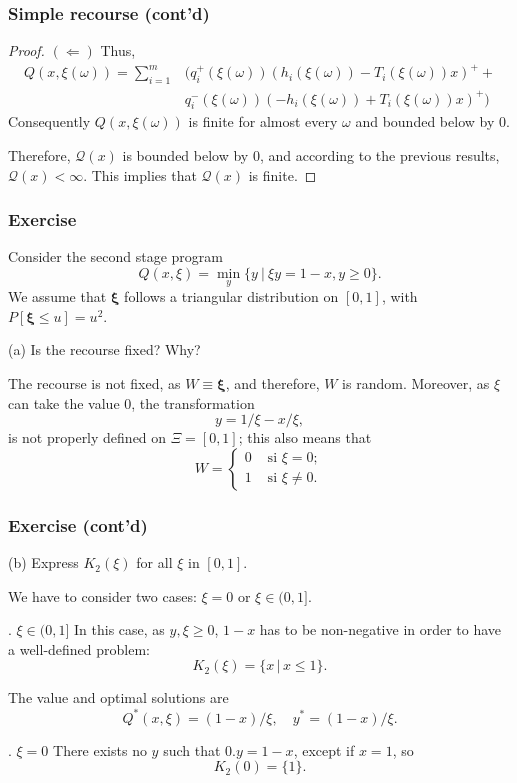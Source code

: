 \documentclass{beamer}
\def\bxi{\boldsymbol\xi}
\def\bxi{\boldsymbol\xi}
\begin{document}
\begin{frame}
\frametitle{Simple recourse (cont'd)}

\begin{proof}
{\bf $(\Leftarrow)$}
Thus,
\begin{align*}
Q(x,\xi(\omega)) = \sum_{i=1}^{m} & (q_i^+(\xi(\omega))(h_i(\xi(\omega))-T_i(\xi(\omega))x)^+ + \\
& q_i^-(\xi(\omega))(-h_i(\xi(\omega))+T_i(\xi(\omega))x)^+ )
\end{align*}
Consequently $Q(x,\xi(\omega))$ is finite for almost every $\omega$ and bounded below by 0.

\mbox{}

Therefore, $\mathcal{Q}(x)$ is bounded below by 0, and according to the previous results, $\mathcal{Q}(x) < \infty$. This implies that $\mathcal{Q}(x)$ is finite.
\end{proof}

\end{frame}

\begin{frame}
\frametitle{Exercise}
	
Consider the second stage program
\[
Q(x, \xi) = \min_y \lbrace y \ |\ \xi y = 1-x, y \geq 0 \rbrace.
\]
We assume that $\bxi$ follows a triangular distribution on $[0,1]$, with $P[\bxi \leq u] = u^2$.
	
\mbox{}
	
{\blue (a)}
Is the recourse fixed? Why?
	
\mbox{}
	
The recourse is not fixed, as $W \equiv \bxi$, and therefore, $W$ is random.
Moreover, as $\xi$ can take the value 0, the transformation
\[
y = 1/\xi - x/\xi,
\]
is not properly defined on $\Xi = [0,1]$; this also means that
\[
W =
\begin{cases}
0 & \mbox{ si } \xi = 0; \\
1 & \mbox{ si } \xi \ne 0.
\end{cases}
\]
	
\end{frame}

\begin{frame}
\frametitle{Exercise (cont'd)}
	
{\blue (b)} Express $K_2(\xi)$ for all $\xi$ in $[0,1]$.
	
\mbox{}
	
We have to consider two cases: $\xi = 0$ or $\xi \in (0,1]$.
	
\mbox{}
	
{. $\xi \in (0,1]$} In this case, as $y, \xi \geq 0$, $1-x$ has to be non-negative in order to have a well-defined problem:
\[
K_2(\xi) = \lbrace x\,|\, x \leq 1 \rbrace.
\]

The value and optimal solutions are
\[
Q^*(x,\xi) = (1-x)/\xi,\quad y^*= (1-x)/\xi.
\]
	
{. $\xi=0$} There exists no $y$ such that $0.y = 1-x$, except if $x = 1$, so
\[
K_2(0) = \lbrace 1 \rbrace.
\]
	
\end{frame}
\end{document}
